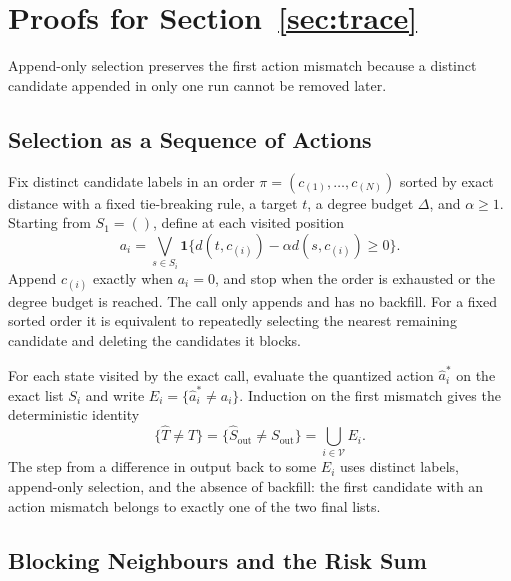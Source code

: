 \section{Proofs for Section~\ref{sec:trace}}
\label{app:p4}

Append-only selection preserves the first action mismatch because a distinct candidate appended in only one run cannot be removed later.

\subsection{Selection as a Sequence of Actions}

Fix distinct candidate labels in an order $\pi=(c_{(1)},\ldots,c_{(N)})$ sorted by exact distance with a fixed tie-breaking rule, a target $t$, a degree budget $\Delta$, and $\alpha\ge1$. Starting from $S_1=()$, define at each visited position
\begin{equation}
a_i=\bigvee_{s\in S_i}\mathbf 1\{d(t,c_{(i)})-\alpha d(s,c_{(i)})\ge0\}.
\end{equation}
Append $c_{(i)}$ exactly when $a_i=0$, and stop when the order is exhausted or the degree budget is reached. The call only appends and has no backfill. For a fixed sorted order it is equivalent to repeatedly selecting the nearest remaining candidate and deleting the candidates it blocks.

For each state visited by the exact call, evaluate the quantized action $\hat a_i^*$ on the exact list $S_i$ and write $E_i=\{\hat a_i^*\ne a_i\}$. Induction on the first mismatch gives the deterministic identity
\begin{equation}
\{\widehat T\ne T\}=\{\widehat S_{\mathrm{out}}\ne S_{\mathrm{out}}\}=\bigcup_{i\in\mathcal V}E_i.
\label{eq:app-trace-identity}
\end{equation}
The step from a difference in output back to some $E_i$ uses distinct labels, append-only selection, and the absence of backfill: the first candidate with an action mismatch belongs to exactly one of the two final lists.

\subsection{Blocking Neighbours and the Risk Sum}

